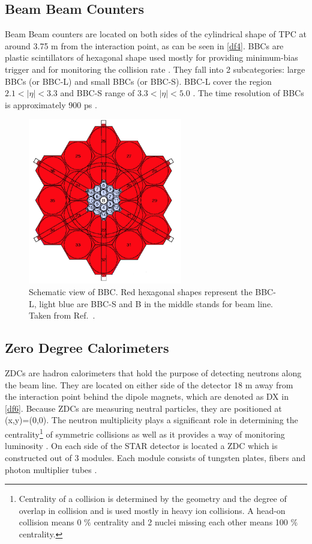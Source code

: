 \subsection{Beam Beam Counters}
Beam Beam counters are located on both sides of the cylindrical shape of TPC at around 3.75 m from the interaction point, as can be seen in \autoref{df4}. BBCs are plastic scintillators of hexagonal shape used mostly for providing minimum-bias trigger and for monitoring the collision rate \cite{raphalthesis}. They fall into 2 subcategories: large BBCs (or BBC-L) and small BBCs (or BBC-S). BBC-L cover the region $2.1<|\eta|<3.3$ and BBC-S range of $3.3<|\eta|<5.0$ \cite{STAR}. The time resolution of BBCs is approximately 900 ps \cite{Truhlar}.


\FloatBarrier
\begin{figure}[ht]
    \centering
    \includegraphics[width=0.6\textwidth]{figures/BBC.jpg}
    \caption[Schematic view of a Beam Beam Chamber]{Schematic view of BBC. Red hexagonal shapes represent the BBC-L, light blue are BBC-S and B in the middle stands for beam line. Taken from Ref.~\cite{STAR}.}
    \label{df7}
\end{figure}
\FloatBarrier

\subsection{Zero Degree Calorimeters}
ZDCs are hadron calorimeters that hold the purpose of detecting neutrons along the beam line. They are located on either side of the detector 18 m away from the interaction point behind the dipole magnets, which are denoted as DX in \autoref{df6}. Because ZDCs are measuring neutral particles, they are positioned at (x,y)=(0,0). The neutron multiplicity plays a significant role in determining the centrality\footnote{Centrality of a collision is determined by the geometry and the degree of overlap in collision and is used mostly in heavy ion collisions. A head-on collision means 0 $\%$ centrality and 2 nuclei missing each other means 100 $\%$ centrality.} of symmetric collisions as well as it provides a way of monitoring luminosity \cite{ZDC}. On each side of the STAR detector is located a ZDC which is constructed out of 3 modules. Each module consists of tungsten plates, fibers and photon multiplier tubes \cite{ZDC}.

